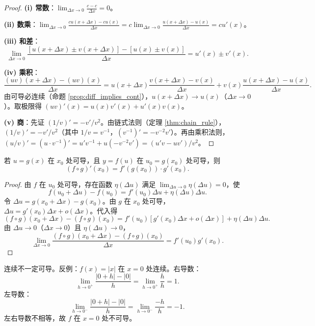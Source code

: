 \begin{proof}
\textbf{(i) 常数}：$\lim_{\Delta x \to 0} \frac{c - c}{\Delta x} = 0$。

\textbf{(ii) 数乘}：$\lim_{\Delta x \to 0} \frac{cu(x+\Delta x) - cu(x)}{\Delta x} = c \lim_{\Delta x \to 0} \frac{u(x+\Delta x) - u(x)}{\Delta x} = cu'(x)$。

\textbf{(iii) 和差}：
\[
\lim_{\Delta x \to 0} \frac{[u(x+\Delta x) \pm v(x+\Delta x)] - [u(x) \pm v(x)]}{\Delta x} = u'(x) \pm v'(x).
\]

\textbf{(iv) 乘积}：
\[
\frac{(uv)(x+\Delta x) - (uv)(x)}{\Delta x} = u(x+\Delta x)\frac{v(x+\Delta x)-v(x)}{\Delta x} + v(x)\frac{u(x+\Delta x)-u(x)}{\Delta x}.
\]
由可导必连续（命题 \ref{prop:diff_implies_cont}），$u(x+\Delta x) \to u(x)$（$\Delta x \to 0$）。取极限得 $(uv)'(x) = u(x)v'(x) + u'(x)v(x)$。

\textbf{(v) 商}：先证 $(1/v)' = -v'/v^2$。由链式法则（定理 \ref{thm:chain_rule}），$(1/v)' = -v'/v^2$（其中 $1/v = v^{-1}$，$(v^{-1})' = -v^{-2}v'$）。再由乘积法则，$(u/v)' = (u \cdot v^{-1})' = u'v^{-1} + u(-v^{-2}v') = (u'v - uv')/v^2$。
\end{proof}

\begin{theorem}[链式法则]\label{thm:chain_rule}
若 $u = g(x)$ 在 $x_0$ 处可导，且 $y = f(u)$ 在 $u_0 = g(x_0)$ 处可导，则
\[(f \circ g)'(x_0) = f'(g(x_0)) \cdot g'(x_0).\]
\end{theorem}

\begin{proof}
由 $f$ 在 $u_0$ 处可导，存在函数 $\eta(\Delta u)$ 满足 $\lim_{\Delta u \to 0} \eta(\Delta u) = 0$，使
\[
f(u_0 + \Delta u) - f(u_0) = f'(u_0)\Delta u + \eta(\Delta u)\Delta u.
\]
令 $\Delta u = g(x_0 + \Delta x) - g(x_0)$。由 $g$ 在 $x_0$ 处可导，$\Delta u = g'(x_0)\Delta x + o(\Delta x)$。代入得
\[
(f \circ g)(x_0 + \Delta x) - (f \circ g)(x_0) = f'(u_0)[g'(x_0)\Delta x + o(\Delta x)] + \eta(\Delta u)\Delta u.
\]
由 $\Delta u \to 0$（$\Delta x \to 0$）且 $\eta(\Delta u) \to 0$，
\[
\lim_{\Delta x \to 0} \frac{(f \circ g)(x_0 + \Delta x) - (f \circ g)(x_0)}{\Delta x} = f'(u_0)g'(x_0).
\]
\end{proof}

\begin{remark}[连续不可导的反例]\label{rem:continuous_not_differentiable}
连续不一定可导。反例：$f(x)=|x|$ 在 $x=0$ 处连续。右导数：
\[
\lim_{h \to 0^+} \frac{|0+h| - |0|}{h} = \lim_{h \to 0^+} \frac{h}{h} = 1.
\]
左导数：
\[
\lim_{h \to 0^-} \frac{|0+h| - |0|}{h} = \lim_{h \to 0^-} \frac{-h}{h} = -1.
\]
左右导数不相等，故 $f$ 在 $x=0$ 处不可导。
\end{remark}

